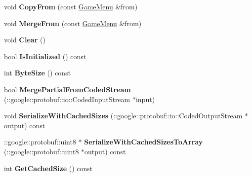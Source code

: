 \begin{DoxyCompactItemize}
\item 
\hypertarget{class_game_menu_a785301f9d4c73689d7aa3115680e870e}{void {\bfseries Copy\-From} (const \hyperlink{class_game_menu}{Game\-Menu} \&from)}\label{class_game_menu_a785301f9d4c73689d7aa3115680e870e}

\item 
\hypertarget{class_game_menu_a8ebfff6cb9a723430dbfdd50903bc411}{void {\bfseries Merge\-From} (const \hyperlink{class_game_menu}{Game\-Menu} \&from)}\label{class_game_menu_a8ebfff6cb9a723430dbfdd50903bc411}

\item 
\hypertarget{class_game_menu_acb122483cb8b5048efd1852bbfba056d}{void {\bfseries Clear} ()}\label{class_game_menu_acb122483cb8b5048efd1852bbfba056d}

\item 
\hypertarget{class_game_menu_aa915693f815cf5daf04471cedfb856e5}{bool {\bfseries Is\-Initialized} () const }\label{class_game_menu_aa915693f815cf5daf04471cedfb856e5}

\item 
\hypertarget{class_game_menu_a02d5db82aef1cc4952c969d49e708ecb}{int {\bfseries Byte\-Size} () const }\label{class_game_menu_a02d5db82aef1cc4952c969d49e708ecb}

\item 
\hypertarget{class_game_menu_af9f1ba343e861e93883b97e91ab8b223}{bool {\bfseries Merge\-Partial\-From\-Coded\-Stream} (\-::google\-::protobuf\-::io\-::\-Coded\-Input\-Stream $\ast$input)}\label{class_game_menu_af9f1ba343e861e93883b97e91ab8b223}

\item 
\hypertarget{class_game_menu_ad8286d01deedb8e7d8be6a538d2ec3d4}{void {\bfseries Serialize\-With\-Cached\-Sizes} (\-::google\-::protobuf\-::io\-::\-Coded\-Output\-Stream $\ast$output) const }\label{class_game_menu_ad8286d01deedb8e7d8be6a538d2ec3d4}

\item 
\hypertarget{class_game_menu_a43ac30c609cbcda0c80ef5882bac6b11}{\-::google\-::protobuf\-::uint8 $\ast$ {\bfseries Serialize\-With\-Cached\-Sizes\-To\-Array} (\-::google\-::protobuf\-::uint8 $\ast$output) const }\label{class_game_menu_a43ac30c609cbcda0c80ef5882bac6b11}

\item 
\hypertarget{class_game_menu_a0c6c6b9b554509c67943a875eca1ee2f}{int {\bfseries Get\-Cached\-Size} () const }\label{class_game_menu_a0c6c6b9b554509c67943a875eca1ee2f}


\end{DoxyCompactItemize}
